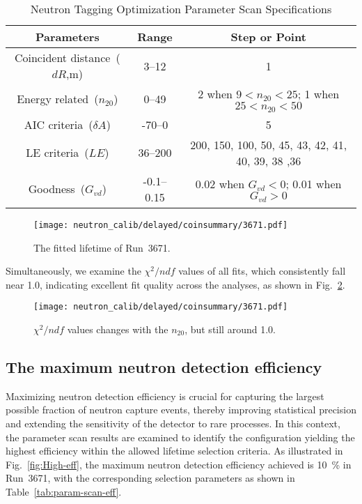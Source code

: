 \begin{table}[htbp]
	\caption{Neutron Tagging Optimization Parameter Scan Specifications}%
	\label{tab:param-scan}
	\centering%
	\begin{tabular}{ccc}
		\toprule%
		Parameters                   & Range      & Step or Point                                     \\
		\midrule%
		Coincident distance~($dR$,m) & 3--12      & 1                                                 \\
		Energy related~($n_{20}$)    & 0--49      & 2 when $9<n_{20}<25$; 1 when $25<n_{20}<50$       \\
		AIC criteria~($\delta A$)    & -70--0     & 5                                                 \\
		LE criteria~($LE$)           & 36--200    & 200, 150, 100, 50, 45, 43, 42, 41, 40, 39, 38 ,36 \\
		Goodness~($G_{vd}$)          & -0.1--0.15 & 0.02 when $G_{vd}<0$; 0.01 when $G_{vd}>0$        \\
		\bottomrule
	\end{tabular}
\end{table}
\begin{figure}[htbp]
	\centering
	\texttt{[image: neutron\_calib/delayed/coinsummary/3671.pdf]}
	\caption{The fitted lifetime of Run~3671.}
	\label{fig:lifetime3671}
\end{figure}
Simultaneously, we examine the $\chi^2/ndf$ values of all fits, which consistently fall near 1.0, indicating excellent fit quality across the analyses, as shown in Fig.~\ref{fig:chi2}.
\begin{figure}[H]
	\centering
	\texttt{[image: neutron\_calib/delayed/coinsummary/3671.pdf]}
	\caption{$\chi^2/ndf$ values changes with the $n_{20}$, but still around 1.0.}
	\label{fig:chi2}
\end{figure}

\subsection{The maximum neutron detection efficiency}
Maximizing neutron detection efficiency is crucial for capturing the largest possible fraction of neutron capture events, thereby improving statistical precision and extending the sensitivity of the detector to rare processes. In this context, the parameter scan results are examined to identify the configuration yielding the highest efficiency within the allowed lifetime selection criteria. As illustrated in Fig.~\ref{fig:High-eff}, the maximum neutron detection efficiency achieved is \SI{10}{\%} in Run~3671, with the corresponding selection parameters as shown in Table~\ref{tab:param-scan-eff}.

